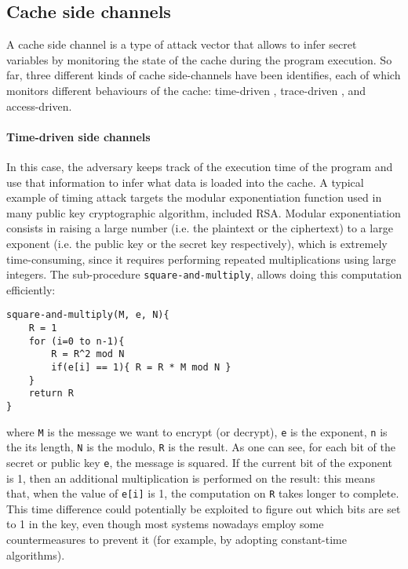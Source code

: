 \documentclass[12pt,a4paper]{book}
\theoremstyle{definition}
\begin{document}
	\subsection{Cache side channels}\label{sec:cache-sc}
	A cache side channel \cite{Zhang2017} is a type of attack vector that allows to infer secret variables by monitoring the state of the cache during the program execution. So far, three different kinds of cache side-channels have been identifies, each of which monitors different behaviours of the cache: time-driven \cite{Page2002}, trace-driven \cite{Page2002}, and access-driven.
	\paragraph{Time-driven side channels} In this case, the adversary keeps track of the execution time of the program and use that information to infer what data is loaded into the cache. 
	A typical example of timing attack targets the modular exponentiation function used in many public key cryptographic algorithm, included RSA. Modular exponentiation consists in raising a large number (i.e. the plaintext or the ciphertext) to a large exponent (i.e. the public key or the secret key respectively), which is extremely time-consuming, since it requires performing repeated multiplications using large integers. The sub-procedure \texttt{square-and-multiply}, allows doing this computation efficiently:
	
	\vspace{3mm}
	\begin{minipage}{.6\textwidth}
		\begin{lstlisting}
square-and-multiply(M, e, N){
	R = 1
	for (i=0 to n-1){
		R = R^2 mod N
		if(e[i] == 1){ R = R * M mod N }
	}	
	return R
}
		\end{lstlisting}
	\end{minipage}
	
	where \texttt{M} is the message we want to encrypt (or decrypt), \texttt{e} is the exponent, \texttt{n} is the its length, \texttt{N} is the modulo, \texttt{R} is the result. As one can see, for each bit of the secret or public key \texttt{e}, the message is squared. If the current bit of the exponent is 1, then an additional multiplication is performed on the result: this means that, when the value of \texttt{e[i]} is 1, the computation on \texttt{R} takes longer to complete. This time difference could potentially be exploited to figure out which bits are set to 1 in the key, even though most systems nowadays employ some countermeasures to prevent it (for example, by adopting constant-time algorithms).
\end{document}
